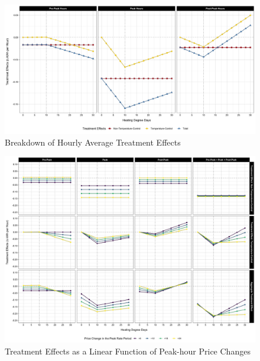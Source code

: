     \begin{figure}[t!]
        \centering
        \includegraphics[scale = 0.1]{03_Chapter-2/00A_Figures/Figure_Breakdown-of-Hourly-ATEs_For-Different-Intervals_All_Knot-10.png}
        \caption{Breakdown of Hourly Average Treatment Effects}
        \label{Figure:Breakdown-of-Hourly-ATEs-in-the-Peak-Rate-Period}
    \end{figure}
\vspace{0.3cm}

    \begin{figure}[t!]
        \centering
        \includegraphics[scale = 0.09]{03_Chapter-2/00A_Figures/Figure_Predicted-Electricity-Savings_By-Intervals-and-HDDs_Spline_Knot-10.png}
        \caption{Treatment Effects as a Linear Function of Peak-hour Price Changes}
        \label{Figure:Treatment-Effects-as-a-Linear-Function-of-Price-Changes-in-the-Peak-Rate-Period}
    \end{figure}
\hspace{0.3cm}

